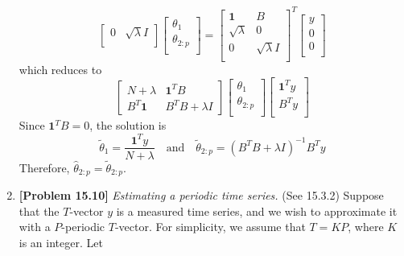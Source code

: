 \begin{enumerate}[label=(\alph*)]
\begin{tcolorbox}
$$\begin{bmatrix}
				      0              & \sqrt{\lambda} I \\
			      \end{bmatrix}
			      \begin{bmatrix}
				      \theta_1     \\
				      \theta_{2:p} \\
			      \end{bmatrix}
			      =
			      \begin{bmatrix}
				      \mathbf{1}     & B                \\
				      \sqrt{\lambda} & 0                \\
				      0              & \sqrt{\lambda} I \\
			      \end{bmatrix}^T
			      \begin{bmatrix}
				      y \\
				      0 \\
				      0 \\
			      \end{bmatrix}
		      $$
		      which reduces to
		      $$
			      \begin{bmatrix}
				      N + \lambda    & \mathbf{1}^T B    \\
				      B^T \mathbf{1} & B^T B + \lambda I
			      \end{bmatrix}
			      \begin{bmatrix}
				      \theta_1     \\
				      \theta_{2:p} \\
			      \end{bmatrix}
			      \begin{bmatrix}
				      \mathbf{1}^T y \\
				      B^T y          \\
			      \end{bmatrix}
		      $$
		      Since $\mathbf{1}^T B = 0$, the solution is
		      $$
			      \tilde{\theta}_1 = \frac{\mathbf{1}^T y}{N + \lambda} \quad \text{and}
			      \quad \tilde{\theta}_{2:p} = (B^T B + \lambda I)^{-1} B^T y
		      $$
		      Therefore, $\hat{\theta}_{2:p} = \tilde{\theta}_{2:p}$.
	      \end{tcolorbox}
	\item \textbf{[Problem 15.10]} \textit{Estimating a periodic time series.}
	      (See 15.3.2) Suppose that the $T$-vector $y$ is a measured time
	      series, and we wish to approximate it with a $P$-periodic $T$-vector.
	      For simplicity, we assume that $T = KP$, where $K$ is an integer. Let

\end{enumerate}
